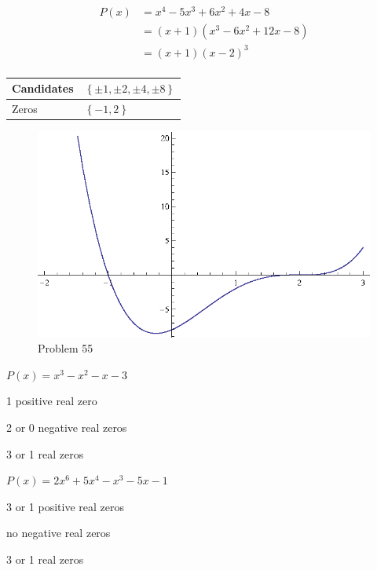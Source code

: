 \documentclass{exam}
\begin{document}
\begin{description}
    \pagebreak

      \item[55] 
        \begin{align*}
          P(x) &= x^4 - 5x^3 + 6x^2 + 4x - 8 \\
               &= (x + 1)(x^3 - 6x^2 + 12x - 8) \\
               &= (x + 1)(x - 2)^3 \\
        \end{align*}

        \begin{tabular}{ll}
          \toprule
          Candidates & $\left\{ \pm 1, \pm 2, \pm 4, \pm 8 \right\}$ \\
          \midrule
          Zeros      & $\left\{ -1, 2 \right\}$ \\
          \bottomrule
        \end{tabular}

        \begin{figure}[H]
          \centering
          \includegraphics[scale=.9]{problem55.eps}
          \caption*{Problem 55}
        \end{figure}

      \item[59]
        $P(x) = x^3 - x^2 - x - 3$
        \begin{itemize*}
          \item 1 positive real zero
          \item 2 or 0 negative real zeros
          \item 3 or 1 real zeros
        \end{itemize*}
        
      \item[60]
        $P(x) = 2x^6 + 5x^4 - x^3 - 5x - 1$
        \begin{itemize*}
          \item 3 or 1 positive real zeros
          \item no negative real zeros
          \item 3 or 1 real zeros
        \end{itemize*}


\end{description}
\end{document}
